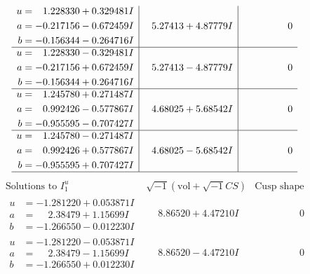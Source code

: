 \documentclass[1p]{elsarticle_modified}
\theoremstyle{definition}
\newcommand{\I}{\sqrt{-1}}
\begin{document}
$$\begin{array}{c|c|c}
\begin{aligned}
u &= \phantom{-}1.228330 + 0.329481 I \\
a &= -0.217156 - 0.672459 I \\
b &= -0.156344 - 0.264716 I\end{aligned}
 & \phantom{-}5.27413 + 4.87779 I & \phantom{-0.000000 } 0 \\ \hline\begin{aligned}
u &= \phantom{-}1.228330 - 0.329481 I \\
a &= -0.217156 + 0.672459 I \\
b &= -0.156344 + 0.264716 I\end{aligned}
 & \phantom{-}5.27413 - 4.87779 I & \phantom{-0.000000 } 0 \\ \hline\begin{aligned}
u &= \phantom{-}1.245780 + 0.271487 I \\
a &= \phantom{-}0.992426 - 0.577867 I \\
b &= -0.955595 - 0.707427 I\end{aligned}
 & \phantom{-}4.68025 + 5.68542 I & \phantom{-0.000000 } 0 \\ \hline\begin{aligned}
u &= \phantom{-}1.245780 - 0.271487 I \\
a &= \phantom{-}0.992426 + 0.577867 I \\
b &= -0.955595 + 0.707427 I\end{aligned}
 & \phantom{-}4.68025 - 5.68542 I & \phantom{-0.000000 } 0\\
 \hline 
 \end{array}$$\newpage$$\begin{array}{c|c|c}  
\text{Solutions to }I^u_{1}& \I (\text{vol} + \sqrt{-1}CS) & \text{Cusp shape}\\
 \hline 
\begin{aligned}
u &= -1.281220 + 0.053871 I \\
a &= \phantom{-}2.38479 + 1.15699 I \\
b &= -1.266550 - 0.012230 I\end{aligned}
 & \phantom{-}8.86520 + 4.47210 I & \phantom{-0.000000 } 0 \\ \hline\begin{aligned}
u &= -1.281220 - 0.053871 I \\
a &= \phantom{-}2.38479 - 1.15699 I \\
b &= -1.266550 + 0.012230 I\end{aligned}
 & \phantom{-}8.86520 - 4.47210 I & \phantom{-0.000000 } 0 \\ \hline\begin{aligned}

\end{aligned}
\end{array}$$
\end{document}
